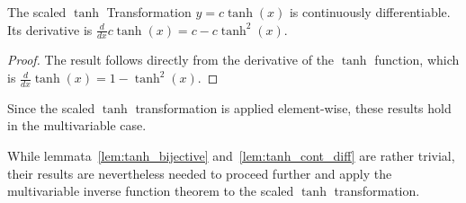 \begin{lemma}\label{lem:tanh_cont_diff}
The scaled $\tanh$ Transformation $y = c \tanh (x)$ is continuously differentiable. Its derivative is $\frac{d}{dx} c \tanh(x) = c - c \tanh^2(x)$.
\end{lemma}
\begin{proof}
The result follows directly from the derivative of the $\tanh$ function, which is $\frac{d}{dx} \tanh(x) = 1 - \tanh^2(x)$.
\end{proof}
\begin{remark}
Since the scaled $\tanh$ transformation is applied element-wise, these results hold in the multivariable case.
\end{remark}
While lemmata~\ref{lem:tanh_bijective} and~\ref{lem:tanh_cont_diff} are rather trivial, their results are nevertheless needed to proceed further and apply the multivariable inverse function theorem to the scaled $\tanh$ transformation.

\transformeddensity*

